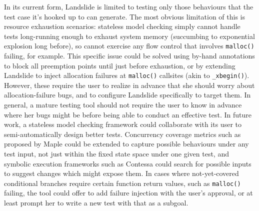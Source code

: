 In its current form, Landslide is limited to testing only those behaviours that the test case it's hooked up to can generate.
The most obvious limitation of this is resource exhaustion scenarios:
stateless model checking simply cannot handle tests long-running enough to exhaust system memory
(succumbing to exponential explosion long before),
so cannot exercise any flow control that involves {\tt malloc()} failing, for example.
This specific issue could be solved using by-hand annotations to block all preemption points until just before exhaustion,
or by extending Landslide to inject allocation failures at {\tt malloc()} callsites (akin to {\tt \_xbegin()}).
However,
these require the user to realize in advance that she should worry about allocation-failure bugs,
and to configure Landslide specifically to target them.
In general, a mature testing tool should not require the user to
know in advance where her bugs might be
before being able to conduct an effective test.
%
In future work, a stateless model checking framework could collaborate with its user to semi-automatically design better tests.
Concurrency coverage metrics such as proposed by Maple \cite{maple}
could be extended to capture possible behaviours under any test input,
not just within the fixed state space under one given test,
and symbolic execution frameworks such as Contessa \cite{contessa}
could search for possible inputs to suggest changes which might expose them.
In cases where not-yet-covered conditional branches require
certain function return values,
such as {\tt malloc()} failing,
the tool could offer to add failure injection with the user's approval,
or at least prompt her to write a new test with that as a subgoal.

